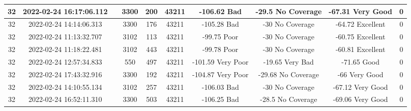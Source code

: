 \begin{longtable*}{|c|c|c|c|c|c|c|c|c|c|}
32&2022-02-24 16:17:06.112&&3300&200&43211& -106.62   Bad         & -29.5     No Coverage & -67.31    Very Good   & 0\\\hline
{}32&2022-02-24 14:14:06.313&&3300&176&43211& -105.28   Bad         & -30       No Coverage & -64.72    Excellent   & 0\\\hline
{}32&2022-02-24 11:13:32.707&&3102&113&43211& -99.75    Poor        & -30       No Coverage & -60.75    Excellent   & 0\\\hline
{}32&2022-02-24 11:18:22.481&&3102&443&43211& -99.78    Poor        & -30       No Coverage & -60.81    Excellent   & 0\\\hline
{}32&2022-02-24 12:57:34.833&&550&497&43211& -101.59   Very Poor   & -19.65    Very Bad    & -71.65    Good        & 0\\\hline
{}32&2022-02-24 17:43:32.916&&3300&192&43211& -104.87   Very Poor   & -29.68    No Coverage & -66       Very Good   & 0\\\hline
{}32&2022-02-24 14:10:55.134&&3102&257&43211& -106.03   Bad         & -30       No Coverage & -67.12    Very Good   & 0\\\hline
{}32&2022-02-24 16:52:11.310&&3300&503&43211& -106.25   Bad         & -28.5     No Coverage & -69.06    Very Good   & 0\\\hline

\end{longtable*}
